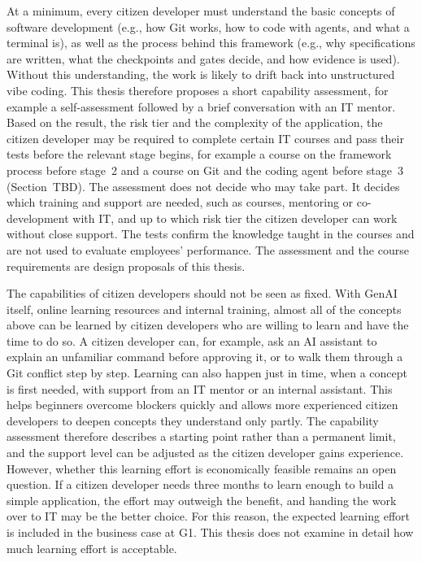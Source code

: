\documentclass[10pt,a4paper]{article}
\begin{document}
At a minimum, every citizen developer must understand the basic concepts of software development (e.g., how Git works, how to code with agents, and what a terminal is), as well as the process behind this framework (e.g., why specifications are written, what the checkpoints and gates decide, and how evidence is used). Without this understanding, the work is likely to drift back into unstructured vibe coding. This thesis therefore proposes a short capability assessment, for example a self-assessment followed by a brief conversation with an IT mentor. Based on the result, the risk tier and the complexity of the application, the citizen developer may be required to complete certain IT courses and pass their tests before the relevant stage begins, for example a course on the framework process before stage~2 and a course on Git and the coding agent before stage~3 (Section~TBD). The assessment does not decide who may take part. It decides which training and support are needed, such as courses, mentoring or co-development with IT, and up to which risk tier the citizen developer can work without close support. The tests confirm the knowledge taught in the courses and are not used to evaluate employees' performance. The assessment and the course requirements are design proposals of this thesis.


The capabilities of citizen developers should not be seen as fixed. With GenAI itself, online learning resources and internal training, almost all of the concepts above can be learned by citizen developers who are willing to learn and have the time to do so. A citizen developer can, for example, ask an AI assistant to explain an unfamiliar command before approving it, or to walk them through a Git conflict step by step. Learning can also happen just in time, when a concept is first needed, with support from an IT mentor or an internal assistant. This helps beginners overcome blockers quickly and allows more experienced citizen developers to deepen concepts they understand only partly. The capability assessment therefore describes a starting point rather than a permanent limit, and the support level can be adjusted as the citizen developer gains experience. However, whether this learning effort is economically feasible remains an open question. If a citizen developer needs three months to learn enough to build a simple application, the effort may outweigh the benefit, and handing the work over to IT may be the better choice. For this reason, the expected learning effort is included in the business case at G1. This thesis does not examine in detail how much learning effort is acceptable.
\end{document}
